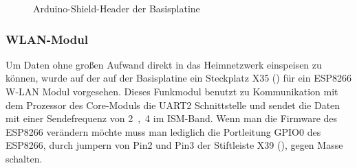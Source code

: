 
\begin{figure}[H]
    \centering
    \qquad
    \qquad
    \caption[Arduino-Shield-Header der Basisplatine]{Arduino-Shield-Header der \gls{Basisplatine}}
    \label{fig:basisplatine-arduino}
\end{figure}

\subsubsection{WLAN-Modul \cite{basis:wlan}}
Um Daten ohne großen Aufwand direkt in das Heimnetzwerk einspeisen zu können, wurde auf der auf der \gls{Basisplatine} ein Steckplatz X35 () für ein ESP8266 W-LAN Modul vorgesehen. Dieses Funkmodul benutzt zu Kommunikation mit dem Prozessor des Core-Moduls die UART2 Schnittstelle und sendet die Daten mit einer Sendefrequenz von \unit{2,4}{\giga\hertz} im ISM-Band. Wenn man die Firmware des ESP8266 verändern möchte muss man lediglich die Portleitung GPIO0 des ESP8266, durch jumpern von Pin2 und Pin3 der Stiftleiste X39 (), gegen Masse schalten.


